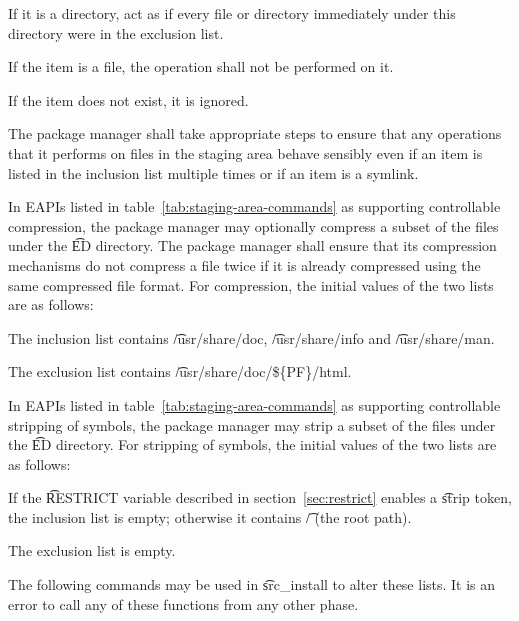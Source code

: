 \begin{compactitem}
\item If it is a directory, act as if every file or directory immediately under this directory
    were in the exclusion list.
\item If the item is a file, the operation shall not be performed on it.
\item If the item does not exist, it is ignored.
\end{compactitem}

The package manager shall take appropriate steps to ensure that any operations that it performs on
files in the staging area behave sensibly even if an item is listed in the inclusion list multiple
times or if an item is a symlink.

 In EAPIs listed in table~\ref{tab:staging-area-commands} as supporting
controllable compression, the package manager may optionally compress a subset of the files under
the \t{ED} directory. The package manager shall ensure that its compression mechanisms do not
compress a file twice if it is already compressed using the same compressed file format.
For compression, the initial values of the two lists are as follows:

\begin{compactitem}
\item The inclusion list contains \t{/usr/share/doc}, \t{/usr/share/info} and \t{/usr/share/man}.
\item The exclusion list contains \t{/usr/share/doc/\$\{PF\}/html}.
\end{compactitem}

 In EAPIs listed in table~\ref{tab:staging-area-commands} as supporting
controllable stripping of symbols, the package manager may strip a subset of the files under the
\t{ED} directory. For stripping of symbols, the initial values of the two lists are as follows:

\begin{compactitem}
\item If the \t{RESTRICT} variable described in section~\ref{sec:restrict} enables a \t{strip}
    token, the inclusion list is empty; otherwise it contains \t{/} (the root path).
\item The exclusion list is empty.
\end{compactitem}

The following commands may be used in \t{src_install} to alter these lists. It is an error to call
any of these functions from any other phase.

